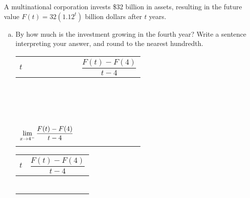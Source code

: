 \documentclass[notes]{subfiles}
\begin{document}
			\newpage
			
		\begin{ex} A multinational corporation invests \$32 billion in assets, resulting in the future value $F(t) = 32(1.12^t)$ billion dollars after $t$ years.  
			\begin{enumerate}[(a)]
				\item By how much is the investment growing in the fourth year?  Write a sentence interpreting your answer, and round to the nearest hundredth.
					\begin{center}
				\begin{minipage}{.45\textwidth}
					\tabulinesep=1mm
					\begin{tabu}{|X[1.1,c]|X[1.5,c]|}\hline
						$t$ 		& $\dfrac{F(t) - F(4)}{t-4}$ \\ \hline
								& \\
								& \\ 
								& \\ \hline
								& \\
							& \\
								& \\ \hline 
								& \\
							& \\ 
								& \\ \hline
								& \\ 
							& \\ 
								& \\ \hline
								& \\
							&\\
								&\\ \hline\hline
								&\\
						$\displaystyle \lim_{x\to 4^-} \dfrac{F(t) -F(4)}{t-4}$ & \\
								&\\ \hline
					\end{tabu}
				\end{minipage}
				\begin{minipage}{.45\textwidth}
					\tabulinesep=1mm
					\begin{tabu}{|X[1.1,c]|X[1.5,c]|}\hline
						$t$ 		& $\dfrac{F(t) - F(4)}{t-4}$ \\ \hline
								& \\
								& \\ 
								& \\ \hline
								& \\
							& \\
								& \\ \hline 

\end{tabu}
\end{minipage}
\end{center}
\end{enumerate}
\end{ex}
\end{document}
